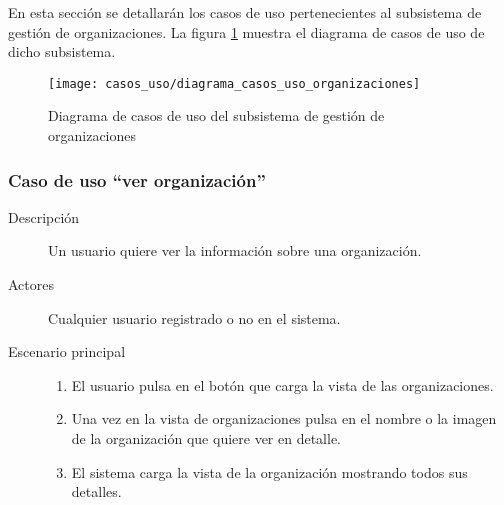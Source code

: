 En esta sección se detallarán los casos de uso pertenecientes al subsistema de gestión de organizaciones. La figura \ref{fig:casos_uso_subsistema_organizaciones} muestra el diagrama de casos de uso de dicho subsistema.

\begin{figure}[h]
\centering
\texttt{[image: casos\_uso/diagrama\_casos\_uso\_organizaciones]}
\caption{Diagrama de casos de uso del subsistema de gestión de organizaciones}
\label{fig:casos_uso_subsistema_organizaciones}
\end{figure}


\subsubsection{Caso de uso ``ver organización''}
\begin{description}
\item[Descripción] Un usuario quiere ver la información sobre una organización.
\item[Actores] Cualquier usuario registrado o no en el sistema.
\item[Escenario principal] 	\hfill
							\begin{enumerate}
							\item El usuario pulsa en el botón que carga la vista de las organizaciones.
							\item Una vez en la vista de organizaciones pulsa en el nombre o la imagen de la organización que quiere ver en detalle.
							\item El sistema carga la vista de la organización mostrando todos sus detalles.
							\end{enumerate}
\end{description}


